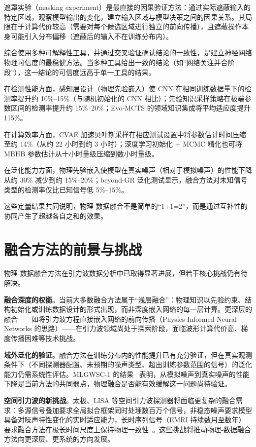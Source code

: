 遮罩实验（masking experiment）是最直接的因果验证方法：通过实际遮蔽输入的特定区域，观察模型输出的变化，建立输入区域与模型决策之间的因果关系。其局限在于计算代价较高（需要对每个候选区域进行独立的前向传播），且遮蔽操作本身可能引入分布偏移（遮蔽后的输入不在训练分布内）。

综合使用多种可解释性工具，并通过交叉验证确认结论的一致性，是建立神经网络物理可信度的最稳健方法。当多种工具给出一致的结论（如“网络关注并合阶段”），这一结论的可信度远高于单一工具的结果。

在检测性能方面，感知层设计（物理先验嵌入）使 CNN 在相同训练数据量下的检测率提升约 10\%--15\%（与随机初始化的 CNN 相比）；先验知识采样策略在极端参数区间的检测率提升约 15\%--20\%；Evo-MCTS 的领域知识集成将平均适应度提升 115\%。

在计算效率方面，CVAE 加速贝叶斯采样在相应测试设置中将参数估计时间压缩至约 14\%（从约 22 小时到约 3 小时）；深度学习初始化 + MCMC 精化也可将 MBHB 参数估计从十小时量级压缩到数小时量级。

在泛化能力方面，物理先验嵌入使模型在真实噪声（相对于模拟噪声）的性能下降从约 30\% 减少到约 15\%--20\%；beyond-GR 泛化测试显示，融合方法对未知信号类型的检测率仅比已知信号低 5\%--15\%。

这些定量结果共同说明，物理-数据融合不是简单的“1+1=2”，而是通过互补性的协同产生了超越各自之和的效果。

\section{融合方法的前景与挑战}

物理-数据融合方法在引力波数据分析中已取得显著进展，但若干核心挑战仍有待解决。

\textbf{融合深度的权衡}。当前大多数融合方法属于“浅层融合”：物理知识以先验约束、结构初始化或训练数据设计的形式出现，而非深度嵌入网络的每一层计算。更深层的融合——如将引力波方程直接嵌入网络的前向传播（Physics-Informed Neural Networks 的思路）——在引力波领域尚处于探索阶段，面临波形计算代价高、梯度传播困难等技术挑战。

\textbf{域外泛化的验证}。融合方法在训练分布内的性能提升已有充分验证，但在真实观测条件下（不同探测器配置、未预期的噪声类型、超出训练参数范围的信号）的泛化能力仍需系统性评估。MLGWSC-1 的结果~\cite{schafer2023mlgwsc1} 表明，从模拟噪声到真实噪声的性能下降是当前方法的共同弱点，物理融合是否能有效缓解这一问题尚待验证。

\textbf{空间引力波的新挑战}。太极、LISA 等空间引力波探测器将面临更复杂的融合需求：多源信号叠加要求全局拟合框架同时处理数百万个信号，非稳态噪声要求模型具备对噪声特性变化的实时适应能力，长时序列信号（EMRI 持续数月至数年）要求融合方法在极长时间尺度上保持物理一致性~\cite{du2026taiji}。这些挑战将推动物理-数据融合方法向更深层、更系统的方向发展。

